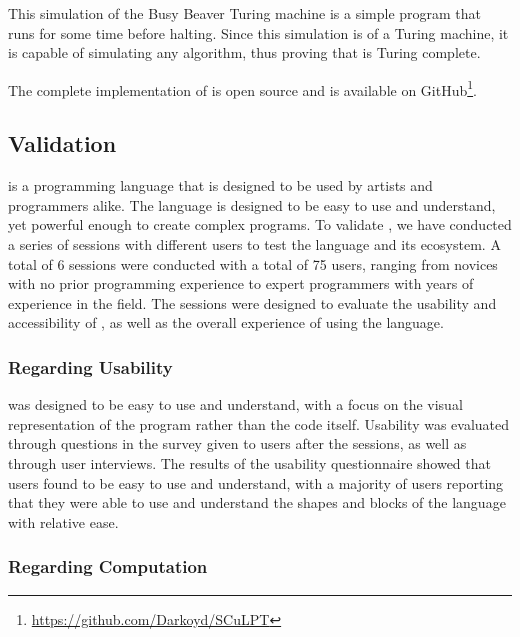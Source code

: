 This simulation of the Busy Beaver Turing machine is a simple program that runs for some time before halting.
Since this simulation is of a Turing machine, it is capable of simulating any algorithm, thus proving that \sculpt is Turing complete.

The complete implementation of \sculpt is open source and is available on GitHub\footnote{\url{https://github.com/Darkoyd/SCuLPT}}.

\subsection{Validation}
\label{sec:results:validation}
\sculpt is a programming language that is designed to be used by artists and programmers alike.
The language is designed to be easy to use and understand, yet powerful enough to create complex programs.
To validate \sculpt, we have conducted a series of sessions with different users to test the language and its ecosystem.
A total of 6 sessions were conducted with a total of 75 users, ranging from novices with no prior programming experience to expert programmers with years of experience in the field.
The sessions were designed to evaluate the usability and accessibility of \sculpt, as well as the overall experience of using the language.

\subsubsection{Regarding Usability}
\label{sec:results:validation:usability}
\sculpt was designed to be easy to use and understand, with a focus on the visual representation of the program rather than the code itself.
Usability was evaluated through questions in the survey given to users after the sessions, as well as through user interviews.
The results of the usability questionnaire showed that users found \sculpt to be easy to use and understand, with a majority of users reporting that they were able to use and understand the shapes and blocks of the language with relative ease.



\subsubsection{Regarding Computation}
\label{sec:results:validation:computation}


